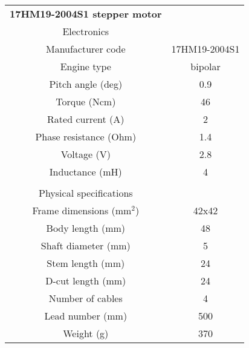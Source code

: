 
\begin{minipage}{0.5\textwidth}
    \centering
    \begin{tabular}{cc}
        \textbf{17HM19-2004S1 stepper motor}&\\
        Electronics&\\
        \hline
        Manufacturer code & 17HM19-2004S1\\
        Engine type & bipolar\\
        Pitch angle (deg) & 0.9 \\
        Torque (Ncm)& 46\\
        Rated current (A) & 2\\
        Phase resistance (Ohm)& 1.4\\
        Voltage (V)& 2.8\\
        Inductance (mH)& 4\\
         & \\
        Physical specifications&\\
        \hline
        Frame dimensions (mm\(^2\))& 42x42 \\
        Body length (mm)& 48 \\
        Shaft diameter (mm)& 5 \\
        Stem length (mm)& 24 \\
        D-cut length (mm)& 24 \\
        Number of cables & 4\\
        Lead number (mm)& 500 \\
        Weight (g) & 370\\
        \hline
    \end{tabular}
    \label{tab:nema_17_specifics_2}
\end{minipage}

